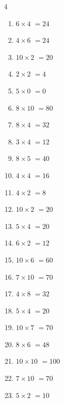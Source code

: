 \begin{multicols}{4}
\begin{enumerate}
  \item $6\times 4$
        $=24$

  \item $4\times 6$
        $=24$

  \item $10\times 2$
        $=20$

  \item $2\times 2$
        $=4$

  \item $5\times 0$
        $=0$

  \item $8\times 10$
        $=80$

  \item $8\times 4$
        $=32$

  \item $3\times 4$
        $=12$

  \item $8\times 5$
        $=40$

  \item $4\times 4$
        $=16$

  \item $4\times 2$
        $=8$

  \item $10\times 2$
        $=20$

  \item $5\times 4$
        $=20$

  \item $6\times 2$
        $=12$

\columnbreak %

  \item $10\times 6$
        $=60$

  \item $7\times 10$
        $=70$

  \item $4\times 8$
        $=32$

  \item $5\times 4$
        $=20$

  \item $10\times 7$
        $=70$

  \item $8\times 6$
        $=48$

  \item $10\times 10$
        $=100$

  \item $7\times 10$
        $=70$

  \item $5\times 2$
        $=10$


\end{enumerate}
\end{multicols}

